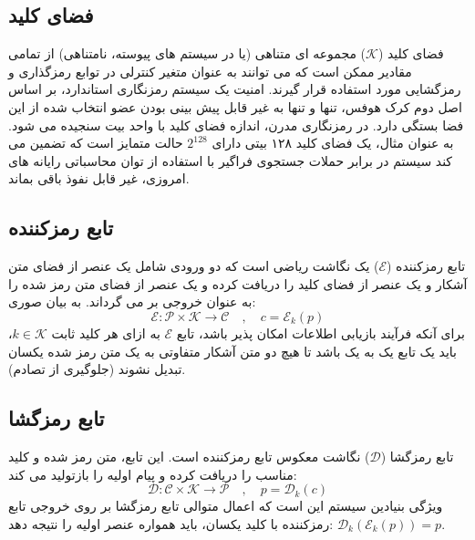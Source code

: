 \documentclass[12pt]{report}
\begin{document}
\subsection[ فضای کلید  ]{ فضای کلید }
فضای کلید ($\mathcal{K}$) مجموعه ای متناهی (یا در سیستم های پیوسته، نامتناهی) از تمامی مقادیر 
ممکن است که می توانند به عنوان متغیر کنترلی در توابع رمزگذاری و رمزگشایی مورد استفاده قرار گیرند. 
امنیت یک سیستم رمزنگاری استاندارد، بر اساس اصل دوم کرک هوفس، تنها و تنها به غیر قابل پیش بینی بودن 
عضو انتخاب شده از این فضا بستگی دارد. در رمزنگاری مدرن، اندازه فضای کلید با واحد بیت سنجیده می شود. 
به عنوان مثال، یک فضای کلید ۱۲۸ بیتی دارای $2^{128}$ حالت متمایز است که تضمین می کند سیستم در 
برابر حملات جستجوی فراگیر با استفاده از توان محاسباتی 
رایانه های امروزی، غیر قابل نفوذ باقی بماند.

\subsection[ تابع رمزکننده  ]{ تابع رمزکننده }
تابع رمزکننده ($\mathcal{E}$) یک نگاشت ریاضی است که دو ورودی شامل یک عنصر از فضای متن آشکار و یک 
عنصر از فضای کلید را دریافت کرده و یک عنصر از فضای متن رمز شده را به عنوان خروجی بر می گرداند. 
به بیان صوری:
\begin{equation}
    \mathcal{E}: \mathcal{P} \times \mathcal{K} \to \mathcal{C} \quad , \quad c = \mathcal{E}_k(p)
\end{equation}
برای آنکه فرآیند بازیابی اطلاعات امکان پذیر باشد، تابع $\mathcal{E}$ به ازای هر کلید ثابت 
$k \in \mathcal{K}$، باید یک تابع یک به یک باشد تا هیچ دو متن آشکار 
متفاوتی به یک متن رمز شده یکسان تبدیل نشوند (جلوگیری از تصادم).

\subsection[ تابع رمزگشا  ]{ تابع رمزگشا }
\label{subsec:decryption-function}
تابع رمزگشا ($\mathcal{D}$) نگاشت معکوس تابع رمزکننده است. این تابع، متن رمز شده و کلید مناسب را 
دریافت کرده و پیام اولیه را بازتولید می کند:
\begin{equation}
    \mathcal{D}: \mathcal{C} \times \mathcal{K} \to \mathcal{P} \quad , \quad p = \mathcal{D}_k(c)
\end{equation}
ویژگی بنیادین سیستم این است که اعمال متوالی تابع رمزگشا بر روی خروجی تابع رمزکننده با کلید یکسان، 
باید همواره عنصر اولیه را نتیجه دهد: $\mathcal{D}_k(\mathcal{E}_k(p)) = p$.
\end{document}
